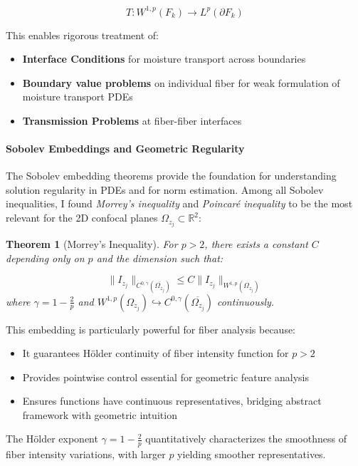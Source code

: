 \documentclass[11pt]{article}
\newtheorem{theorem}{Theorem}[section]
\begin{document}
\[
T : W^{1, p}(F_k) \to L^p(\partial F_k)
\]

This enables rigorous treatment of:
\begin{itemize}
    \item \textbf{Interface Conditions} for moisture transport across boundaries
    \item \textbf{Boundary value problems} on individual fiber for weak formulation of moisture transport PDEs 
    \item \textbf{Transmission Problems} at fiber-fiber interfaces
\end{itemize}

\paragraph{Sobolev Embeddings and Geometric Regularity}

The Sobolev embedding theorems provide the foundation for understanding solution regularity in PDEs and for norm estimation. Among all Sobolev inequalities, I found \textit{Morrey's inequality} and \textit{Poincar\'e inequality} to be the most relevant for the 2D confocal planes $\Omega_{z_j} \subset \mathbb{R}^2$:

\begin{theorem} [Morrey's Inequality]
    For $p>2$, there exists a constant $C$ depending only on $p$ and the dimension such that:

    \[
    \|I_{z_j}\|_{C^{0, \gamma}(\overline{\Omega_{z_j}})} \leq C \|I_{z_j}\|_{W^{1, p}(\Omega_{z_j})}
    \]
    where $\gamma = 1 - \frac{2}{p}$ and $W^{1, p}(\Omega_{z_j}) \hookrightarrow C^{0, \gamma}(\overline{\Omega_{z_j}})$ continuously. 
\end{theorem}

    This embedding is particularly powerful for fiber analysis because:
    \begin{itemize}
        \item It guarantees H\"older continuity of fiber intensity function for $p > 2$
        \item Provides pointwise control essential for geometric feature analysis
        \item Ensures functions have continuous representatives, bridging abstract framework with geometric intuition
    \end{itemize}
    
The H\"older exponent $\gamma = 1 - \frac{2}{p}$ quantitatively characterizes the smoothness of fiber intensity variations, with larger $p$ yielding smoother representatives.
\end{document}
